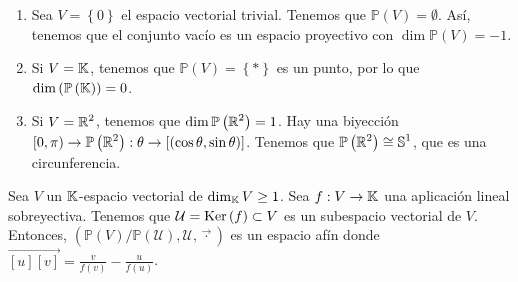 \begin{eg}
\begin{enumerate}
	\item Sea $\displaystyle V = \left\{ 0\right\}  $ el espacio vectorial trivial. Tenemos que $\displaystyle \mathbb{P}\left(V\right) = \emptyset $. Así, tenemos que el conjunto vacío es un espacio proyectivo con $\displaystyle \dim\mathbb{P}\left(V\right) = -1 $.
	\item Si $\displaystyle V = \mathbb{K} $, tenemos que $\displaystyle \mathbb{P}\left(V\right) = \left\{ *\right\}  $ es un punto, por lo que $\displaystyle \dim\left(\mathbb{P}\left(\mathbb{K}\right)\right) = 0 $.
	\item Si $\displaystyle V = \mathbb{R}^{2} $, tenemos que $\displaystyle \dim\mathbb{P}\left(\mathbb{R}^{2}\right) = 1 $. Hay una biyección $\displaystyle [0,\pi) \to \mathbb{P}\left(\mathbb{R}^{2}\right) : \theta \to [\left(\cos\theta, \sin \theta\right)] $. Tenemos que $\displaystyle \mathbb{P}\left(\mathbb{R}^{2}\right) \cong \mathbb{S}^{1}$, que es una circunferencia.
\end{enumerate}
\end{eg}
\begin{prop}
	Sea $\displaystyle V $ un $\displaystyle \mathbb{K} $-espacio vectorial de $\displaystyle \dim _{\mathbb{K}}V\geq 1 $. Sea $\displaystyle f : V \to \mathbb{K} $ una aplicación lineal sobreyectiva. Tenemos que $\displaystyle \mathcal{U} = \operatorname{Ker}\left(f\right) \subset V $ es un subespacio vectorial de $\displaystyle V $. Entonces, $\displaystyle \left(\mathbb{P}\left(V\right)/\mathbb{P}\left(\mathcal{U}\right), \mathcal{U}, \vec{ \cdot }\right) $ es un espacio afín donde $\displaystyle \overrightarrow{[u][v]}  = \frac{v}{f\left(v\right)}-\frac{u}{f\left(u\right)}$.
\end{prop}
